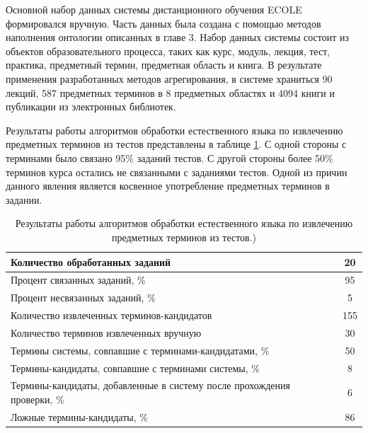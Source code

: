 Основной набор данных системы дистанционного обучения ECOLE формировался вручную. Часть данных была создана с помощью методов наполнения онтологии описанных в главе 3. Набор данных системы состоит из объектов образовательного процесса, таких как курс, модуль, лекция, тест, практика, предметный термин, предметная область и книга. В результате применения разработанных методов агрегирования, в системе храниться 90 лекций, 587 предметных терминов в 8 предметных областях и 4094 книги и публикации из электронных библиотек.   

Результаты работы алгоритмов обработки естественного языка по извлечению предметных терминов из тестов представлены в таблице \ref{table:2}. С одной стороны с терминами было связано 95\% заданий тестов. С другой стороны более 50\% терминов курса остались не связанными с заданиями тестов. Одной из причин данного явления является косвенное употребление предметных терминов в задании.

\begin{table}[h!]
\centering
\caption{Результаты работы алгоритмов обработки естественного языка по извлечению предметных терминов из тестов.)}
\label{table:2}
\begin{tabular}{ |p{12cm}|c|  }
\hline Количество обработанных заданий & 20 \\
\hline Процент связанных заданий, \% & 95 \\
\hline Процент несвязанных заданий, \% & 5 \\
\hline Количество извлеченных терминов-кандидатов & 155 \\
\hline Количество терминов извлеченных вручную & 30 \\
\hline Термины системы, совпавшие с терминами-кандидатами, \% & 50 \\
\hline Термины-кандидаты, совпавшие с терминами системы, \% & 8 \\
\hline Термины-кандидаты, добавленные в систему после прохождения проверки, \%  & 6 \\
\hline Ложные термины-кандидаты, \% & 86 \\
\hline
\end{tabular}
\end{table}  



